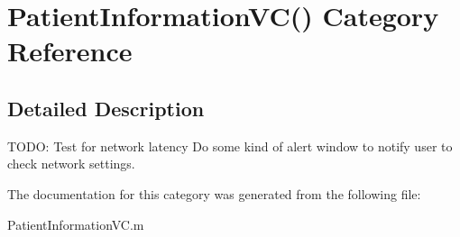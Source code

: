 \hypertarget{category_patient_information_v_c_07_08}{\section{Patient\-Information\-V\-C() Category Reference}
\label{category_patient_information_v_c_07_08}
}


\subsection{Detailed Description}
T\-O\-D\-O\-: Test for network latency Do some kind of alert window to notify user to check network settings. 

The documentation for this category was generated from the following file\-:\begin{DoxyCompactItemize}
\item 
Patient\-Information\-V\-C.\-m\end{DoxyCompactItemize}
